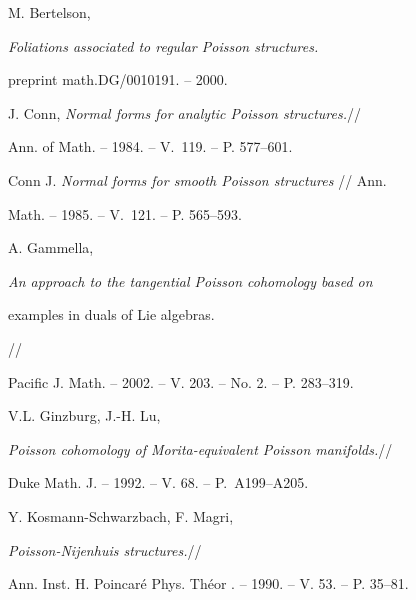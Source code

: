  






















M. Bertelson,


{\it Foliations associated to regular Poisson structures.}


preprint math.DG/0010191. -- 2000.







J. Conn, {\it Normal forms for analytic Poisson structures.}//


Ann. of Math. -- 1984. -- V.~119. -- P. 577--601.







Conn J. {\it Normal forms for smooth Poisson structures} // Ann.


Math. -- 1985. -- V.~121. -- P. 565--593.







A. Gammella,


{\it An approach to the tangential Poisson cohomology based on


examples in duals of Lie algebras.}//


Pacific J. Math. -- 2002. -- V. 203. -- No. 2. -- P. 283--319.







V.L. Ginzburg, J.-H. Lu,


{\it Poisson cohomology of Morita-equivalent Poisson manifolds.}//


Duke Math. J. -- 1992. -- V. 68. -- P.~A199--A205.







Y. Kosmann-Schwarzbach, F. Magri,


{\it Poisson-Nijenhuis structures.}//


Ann. Inst. H. Poincar\'e Phys. Th\'eor . -- 1990. -- V. 53. -- P. 35--81.





